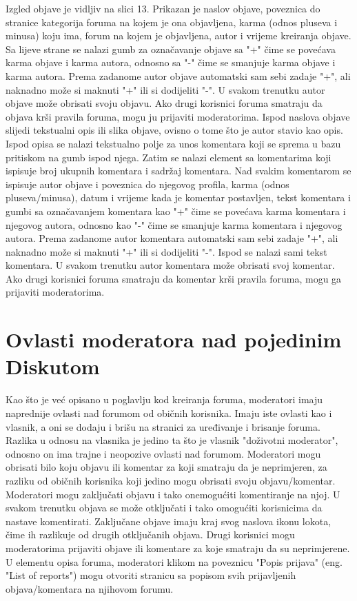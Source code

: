 \documentclass{foi}
\begin{document}
Izgled objave je vidljiv na slici 13. Prikazan je naslov objave, poveznica do stranice kategorija foruma na kojem je ona objavljena, karma (odnos pluseva i minusa) koju ima, forum na kojem je objavljena, autor i vrijeme kreiranja objave. Sa lijeve strane se nalazi gumb za označavanje objave sa "+" čime se povećava karma objave i karma autora, odnosno sa "-" čime se smanjuje karma objave i karma autora. Prema zadanome autor objave automatski sam sebi zadaje "+", ali naknadno može si maknuti "+" ili si dodijeliti "-". U svakom trenutku autor objave može obrisati svoju objavu. Ako drugi korisnici foruma smatraju da objava krši pravila foruma, mogu ju prijaviti moderatorima. Ispod naslova objave slijedi tekstualni opis ili slika objave, ovisno o tome što je autor stavio kao opis. Ispod opisa se nalazi tekstualno polje za unos komentara koji se sprema u bazu pritiskom na gumb ispod njega. Zatim se nalazi element sa komentarima koji ispisuje broj ukupnih komentara i sadržaj komentara. Nad svakim komentarom se ispisuje autor objave i poveznica do njegovog profila, karma (odnos pluseva/minusa), datum i vrijeme kada je komentar postavljen, tekst komentara i gumbi sa označavanjem komentara kao "+" čime se povećava karma komentara i njegovog autora, odnosno kao "-" čime se smanjuje karma komentara i njegovog autora. Prema zadanome autor komentara automatski sam sebi zadaje "+", ali naknadno može si maknuti "+" ili si dodijeliti "-". Ispod se nalazi sami tekst komentara. U svakom trenutku autor komentara može obrisati svoj komentar. Ako drugi korisnici foruma smatraju da komentar krši pravila foruma, mogu ga prijaviti moderatorima.

\section{Ovlasti moderatora nad pojedinim Diskutom}

Kao što je već opisano u poglavlju kod kreiranja foruma, moderatori imaju naprednije ovlasti nad forumom od običnih korisnika. Imaju iste ovlasti kao i vlasnik, a oni se dodaju i brišu na stranici za uređivanje i brisanje foruma. Razlika u odnosu na vlasnika je jedino ta što je vlasnik "doživotni moderator", odnosno on ima trajne i neopozive ovlasti nad forumom. Moderatori mogu obrisati bilo koju objavu ili komentar za koji smatraju da je neprimjeren, za razliku od običnih korisnika koji jedino mogu obrisati svoju objavu/komentar. Moderatori mogu zaključati objavu i tako onemogućiti komentiranje na njoj. U svakom trenutku objava se može otključati i tako omogućiti korisnicima da nastave komentirati. Zaključane objave imaju kraj svog naslova ikonu lokota, čime ih razlikuje od drugih otključanih objava. Drugi korisnici mogu moderatorima prijaviti objave ili komentare za koje smatraju da su neprimjerene. U elementu opisa foruma, moderatori klikom na poveznicu "Popis prijava" (eng. "List of reports") mogu otvoriti stranicu sa popisom svih prijavljenih objava/komentara na njihovom forumu.
\end{document}
